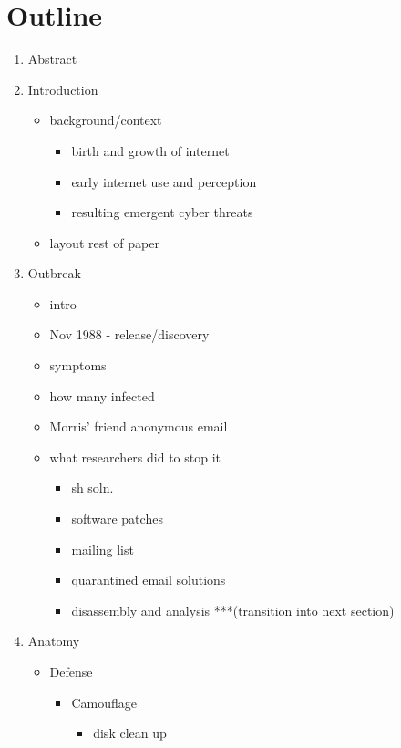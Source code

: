 \section*{Outline}


\begin{enumerate}
\item Abstract
\item Introduction
	\begin{itemize}
	\item background/context
    	\begin{itemize}
        \item birth and growth of internet
        \item early internet use and perception
        \item resulting emergent cyber threats
        \end{itemize}
	\item layout rest of paper
	\end{itemize}
\item Outbreak
	\begin{itemize}
    \item intro
	\item Nov 1988 - release/discovery
    \item symptoms
    \item how many infected
    \item Morris' friend anonymous email
    \item what researchers did to stop it
    	\begin{itemize}
    	\item sh soln.
        \item software patches
        \item mailing list
        \item quarantined email solutions
        \item disassembly and analysis ***(transition into next section)
    	\end{itemize}
	\end{itemize}
\item Anatomy
	\begin{itemize}
    \item Defense
    	\begin{itemize}
        	\item Camouflage
            	\begin{itemize}
        		\item disk clean up

\end{itemize}
\end{itemize}
\end{itemize}
\end{enumerate}
